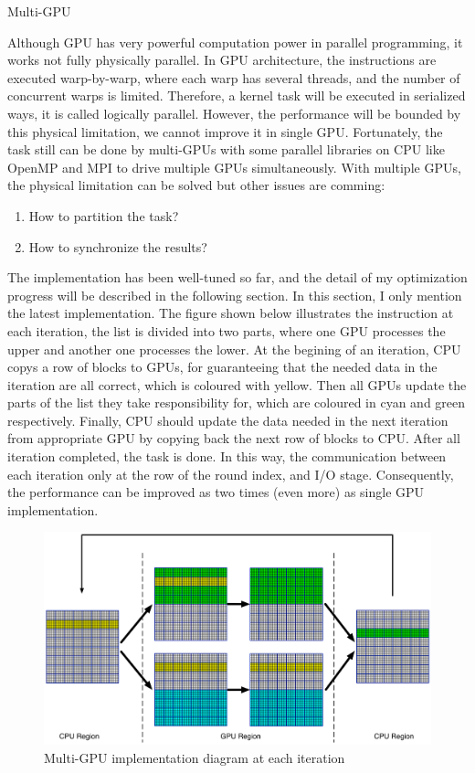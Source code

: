 \documentclass[12pt]{article}
\makeatletter
\renewenvironment{itemize}
{\list{$\bullet$}{\leftmargin\z@ \labelwidth\z@ \itemindent-\leftmargin
\let\makelabel\descriptionlabel}}
{\endlist}
\makeatother
\begin{document}
\begin{itemize}
    \newpage
    \item Multi-GPU
    \begin{flushleft}
        Although GPU has very powerful computation power in parallel programming, it works not fully physically parallel. In GPU architecture, the instructions are executed warp-by-warp, where each warp has several threads, and the number of concurrent warps is limited. Therefore, a kernel task will be executed in serialized ways, it is called logically parallel. However, the performance will be bounded by this physical limitation, we cannot improve it in single GPU. Fortunately, the task still can be done by multi-GPUs with some parallel libraries on CPU like OpenMP and MPI to drive multiple GPUs simultaneously. With multiple GPUs, the physical limitation can be solved but other issues are comming:
        \begin{enumerate}
            \item How to partition the task?
            \item How to synchronize the results?
        \end{enumerate}
        The implementation has been well-tuned so far, and the detail of my optimization progress will be described in the following section. In this section, I only mention the latest implementation. The figure shown below illustrates the instruction at each iteration, the list is divided into two parts, where one GPU processes the upper and another one processes the lower. At the begining of an iteration, CPU copys a row of blocks to GPUs, for guaranteeing that the needed data in the iteration are all correct, which is coloured with yellow. Then all GPUs update the parts of the list they take responsibility for, which are coloured in cyan and green respectively. Finally, CPU should update the data needed in the next iteration from appropriate GPU by copying back the next row of blocks to CPU. After all iteration completed, the task is done. In this way, the communication between each iteration only at the row of the round index, and I/O stage. Consequently, the performance can be improved as two times (even more) as single GPU implementation.
    \end{flushleft}
    \begin{figure}[ht]
        \includegraphics[scale=.25]{./multiGPU_algo_diagram3.png}
        \caption{Multi-GPU implementation diagram at each iteration}
    \end{figure}
\end{itemize}
\end{document}
